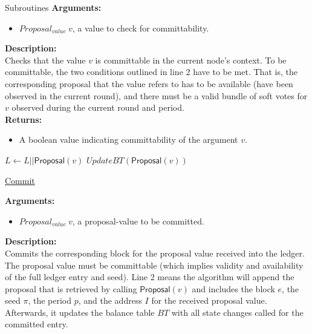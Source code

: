 \documentclass[10pt,a4paper]{article}
\begin{document}
\begin{section}{Subroutines}
\noindent \textbf{Arguments:}
\begin{itemize}
    \item $Proposal_{value} \ v$, a value to check for committability.
  \end{itemize}

\noindent \textbf{Description:}\\
Checks that the value $v$ is committable in the current node's context.
To be committable, the two conditions outlined in line 2 have to be met.
That is, the corresponding proposal that the value refers to has to be
available (have been observed in the current round), and there must
be a valid bundle of soft votes for $v$ observed during the current round and
period. \\

\noindent \textbf{Returns:}
\begin{itemize}
    \item A boolean value indicating committability of the argument $v$.
  \end{itemize}


\begin{algorithm}[H]
    \begin{algorithmic}[1]

    \State $L \gets L || \mathsf{Proposal}(v)$
    \State $UpdateBT(\mathsf{Proposal}(v))$

    \EndFunction
    \end{algorithmic}
    \caption{\underline{Commit}}
\end{algorithm}


\noindent \textbf{Arguments:}
\begin{itemize}
    \item $Proposal_{value} \ v$, a proposal-value to be committed.
  \end{itemize}

\noindent \textbf{Description:}\\
Commits the corresponding block for the proposal value received into the ledger.
The proposal value must be committable (which implies validity and availability of the full
ledger entry and seed).
Line 2 means the algorithm will append the proposal that is retrieved by calling $\mathsf{Proposal}(v)$ and
includes the block $e$, the seed $\pi$, the period $p$, and the address $I$ for the received proposal value.
Afterwards, it updates the balance table $BT$ with all state changes called for the committed entry.


\end{section}
\end{document}
